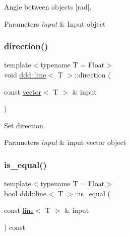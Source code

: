 Angle between objects \mbox{[}rad\mbox{]}. 


\begin{DoxyParams}{Parameters}
{\em input} & Input object \\
\hline
\end{DoxyParams}
\mbox{\label{classddd_1_1line_a67a08be8f16587b17cb7a9fb927f9c32}} 
\subsubsection{\texorpdfstring{direction()}{direction()}}
{\footnotesize\ttfamily template$<$typename T = Float$>$ \\
void \hyperlink{classddd_1_1line}{ddd\+::line}$<$ T $>$\+::direction (\begin{DoxyParamCaption}\item[{const \hyperlink{classddd_1_1vector}{vector}$<$ T $>$ \&}]{input }\end{DoxyParamCaption})\hspace{0.3cm}{\ttfamily [inline]}}



Set direction. 


\begin{DoxyParams}{Parameters}
{\em input} & input vector object \\
\hline
\end{DoxyParams}
\mbox{\label{classddd_1_1line_aecc0993bff268ebf77fb77665ad003a6}} 
\subsubsection{\texorpdfstring{is\+\_\+equal()}{is\_equal()}}
{\footnotesize\ttfamily template$<$typename T = Float$>$ \\
bool \hyperlink{classddd_1_1line}{ddd\+::line}$<$ T $>$\+::is\+\_\+equal (\begin{DoxyParamCaption}\item[{const \hyperlink{classddd_1_1line}{line}$<$ T $>$ \&}]{input }\end{DoxyParamCaption}) const\hspace{0.3cm}{\ttfamily [inline]}}



